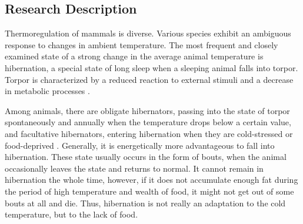 \documentclass[14pt,a4paper]{scrartcl}
\begin{document}
\subsection{Research Description}
\label{sec:Introduction:Research Description}

Thermoregulation of mammals is diverse. Various species exhibit an ambiguous response to changes in ambient temperature. The most frequent and closely examined state of a strong change in the average animal temperature is hibernation, a special state of long sleep when a sleeping animal falls into torpor. Torpor is characterized by a reduced reaction to external stimuli and a decrease in metabolic processes \citep{Ruf2015}.

Among animals, there are obligate hibernators, passing into the state of torpor spontaneously and annually when the temperature drops below a certain value, and facultative hibernators, entering hibernation when they are cold-stressed or food-deprived \citep{Harlow2001}. Generally, it is energetically more advantageous to fall into hibernation. These state usually occurs in the form of bouts, when the animal occasionally leaves the state and returns to normal. It cannot remain in hibernation the whole time, however, if it does not accumulate enough fat during the period of high temperature and wealth of food, it might not get out of some bouts at all and die. Thus, hibernation is not really an adaptation to the cold temperature, but to the lack of food.
\end{document}

